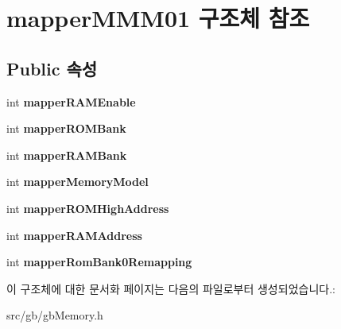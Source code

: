\hypertarget{structmapper_m_m_m01}{}\section{mapper\+M\+M\+M01 구조체 참조}
\label{structmapper_m_m_m01}
\subsection*{Public 속성}
\begin{DoxyCompactItemize}
\item 
\mbox{\label{structmapper_m_m_m01_aa6b5a4c8f0ea53c5e2388f1feb168d4f}} 
int {\bfseries mapper\+R\+A\+M\+Enable}
\item 
\mbox{\label{structmapper_m_m_m01_a3910af13771783e82d42fc1c9fe55157}} 
int {\bfseries mapper\+R\+O\+M\+Bank}
\item 
\mbox{\label{structmapper_m_m_m01_a2f61701eeaa2c54843c49ea9a20a364c}} 
int {\bfseries mapper\+R\+A\+M\+Bank}
\item 
\mbox{\label{structmapper_m_m_m01_a007dd4c2ddf664624e8d2fb89c132621}} 
int {\bfseries mapper\+Memory\+Model}
\item 
\mbox{\label{structmapper_m_m_m01_a934a4728ec31f549910192215c163947}} 
int {\bfseries mapper\+R\+O\+M\+High\+Address}
\item 
\mbox{\label{structmapper_m_m_m01_a582eba3e06837207223913c29d8e152d}} 
int {\bfseries mapper\+R\+A\+M\+Address}
\item 
\mbox{\label{structmapper_m_m_m01_ad6ee8a3b9dbf7536cfb40081fad78a95}} 
int {\bfseries mapper\+Rom\+Bank0\+Remapping}
\end{DoxyCompactItemize}


이 구조체에 대한 문서화 페이지는 다음의 파일로부터 생성되었습니다.\+:\begin{DoxyCompactItemize}
\item 
src/gb/gb\+Memory.\+h\end{DoxyCompactItemize}
